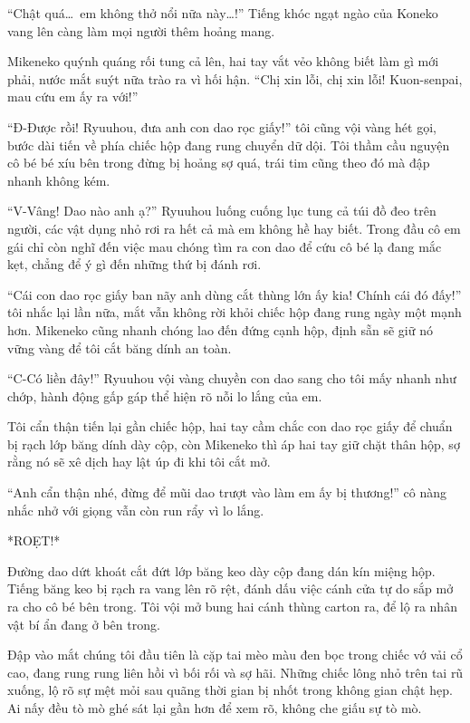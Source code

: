 ﻿\documentclass[../main.tex]{subfiles}
\begin{document}
``Chật quá\dots\ em không thở nổi nữa này\dots!'' Tiếng khóc ngạt ngào của Koneko vang lên càng làm mọi người thêm hoảng mang.

Mikeneko quýnh quáng rối tung cả lên, hai tay vắt vẻo không biết làm gì mới phải, nước mắt suýt nữa trào ra vì hối hận. ``Chị xin lỗi, chị xin lỗi! Kuon-senpai, mau cứu em ấy ra với!''

``Đ-Được rồi! Ryuuhou, đưa anh con dao rọc giấy!'' tôi cũng vội vàng hét gọi, bước dài tiến về phía chiếc hộp đang rung chuyển dữ dội. Tôi thầm cầu nguyện cô bé bé xíu bên trong đừng bị hoảng sợ quá, trái tim cũng theo đó mà đập nhanh không kém.

``V-Vâng! Dao nào anh ạ?'' Ryuuhou luống cuống lục tung cả túi đồ đeo trên người, các vật dụng nhỏ rơi ra hết cả mà em không hề hay biết. Trong đầu cô em gái chỉ còn nghĩ đến việc mau chóng tìm ra con dao để cứu cô bé lạ đang mắc kẹt, chẳng để ý gì đến những thứ bị đánh rơi.

``Cái con dao rọc giấy ban nãy anh dùng cắt thùng lớn ấy kia! Chính cái đó đấy!'' tôi nhắc lại lần nữa, mắt vẫn không rời khỏi chiếc hộp đang rung ngày một mạnh hơn. Mikeneko cũng nhanh chóng lao đến đứng cạnh hộp, định sẵn sẽ giữ nó vững vàng để tôi cắt băng dính an toàn.

``C-Có liền đây!'' Ryuuhou vội vàng chuyền con dao sang cho tôi mấy nhanh như chớp, hành động gấp gáp thể hiện rõ nỗi lo lắng của em.

Tôi cẩn thận tiến lại gần chiếc hộp, hai tay cầm chắc con dao rọc giấy để chuẩn bị rạch lớp băng dính dày cộp, còn Mikeneko thì áp hai tay giữ chặt thân hộp, sợ rằng nó sẽ xê dịch hay lật úp đi khi tôi cắt mở.

``Anh cẩn thận nhé, đừng để mũi dao trượt vào làm em ấy bị thương!'' cô nàng nhắc nhở với giọng vẫn còn run rẩy vì lo lắng.

*ROẸT!*

Đường dao dứt khoát cắt đứt lớp băng keo dày cộp đang dán kín miệng hộp. Tiếng băng keo bị rạch ra vang lên rõ rệt, đánh dấu việc cánh cửa tự do sắp mở ra cho cô bé bên trong. Tôi vội mở bung hai cánh thùng carton ra, để lộ ra nhân vật bí ẩn đang ở bên trong.

Đập vào mắt chúng tôi đầu tiên là cặp tai mèo màu đen bọc trong chiếc vớ vải cổ cao, đang rung rung liên hồi vì bối rối và sợ hãi. Những chiếc lông nhỏ trên tai rũ xuống, lộ rõ sự mệt mỏi sau quãng thời gian bị nhốt trong không gian chật hẹp. Ai nấy đều tò mò ghé sát lại gần hơn để xem rõ, không che giấu sự tò mò.
\end{document}
